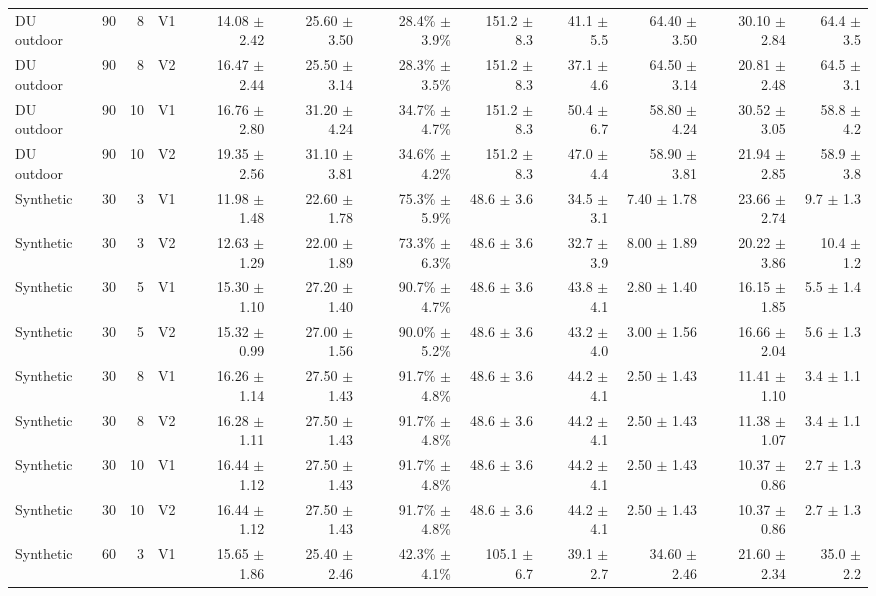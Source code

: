 \documentclass[10pt,a4paper]{article}
\begin{document}
\begin{landscape}
\begin{longtable}{@{}lrrlrrrrrrrr@{}}
DU outdoor & 90 & 8 & V1 & 14.08 $\pm$ 2.42 & 25.60 $\pm$ 3.50 & 28.4\% $\pm$ 3.9\% & 151.2 $\pm$ 8.3 & 41.1 $\pm$ 5.5 & 64.40 $\pm$ 3.50 & 30.10 $\pm$ 2.84 & 64.4 $\pm$ 3.5 \\
DU outdoor & 90 & 8 & V2 & 16.47 $\pm$ 2.44 & 25.50 $\pm$ 3.14 & 28.3\% $\pm$ 3.5\% & 151.2 $\pm$ 8.3 & 37.1 $\pm$ 4.6 & 64.50 $\pm$ 3.14 & 20.81 $\pm$ 2.48 & 64.5 $\pm$ 3.1 \\
DU outdoor & 90 & 10 & V1 & 16.76 $\pm$ 2.80 & 31.20 $\pm$ 4.24 & 34.7\% $\pm$ 4.7\% & 151.2 $\pm$ 8.3 & 50.4 $\pm$ 6.7 & 58.80 $\pm$ 4.24 & 30.52 $\pm$ 3.05 & 58.8 $\pm$ 4.2 \\
DU outdoor & 90 & 10 & V2 & 19.35 $\pm$ 2.56 & 31.10 $\pm$ 3.81 & 34.6\% $\pm$ 4.2\% & 151.2 $\pm$ 8.3 & 47.0 $\pm$ 4.4 & 58.90 $\pm$ 3.81 & 21.94 $\pm$ 2.85 & 58.9 $\pm$ 3.8 \\
Synthetic & 30 & 3 & V1 & 11.98 $\pm$ 1.48 & 22.60 $\pm$ 1.78 & 75.3\% $\pm$ 5.9\% & 48.6 $\pm$ 3.6 & 34.5 $\pm$ 3.1 & 7.40 $\pm$ 1.78 & 23.66 $\pm$ 2.74 & 9.7 $\pm$ 1.3 \\
Synthetic & 30 & 3 & V2 & 12.63 $\pm$ 1.29 & 22.00 $\pm$ 1.89 & 73.3\% $\pm$ 6.3\% & 48.6 $\pm$ 3.6 & 32.7 $\pm$ 3.9 & 8.00 $\pm$ 1.89 & 20.22 $\pm$ 3.86 & 10.4 $\pm$ 1.2 \\
Synthetic & 30 & 5 & V1 & 15.30 $\pm$ 1.10 & 27.20 $\pm$ 1.40 & 90.7\% $\pm$ 4.7\% & 48.6 $\pm$ 3.6 & 43.8 $\pm$ 4.1 & 2.80 $\pm$ 1.40 & 16.15 $\pm$ 1.85 & 5.5 $\pm$ 1.4 \\
Synthetic & 30 & 5 & V2 & 15.32 $\pm$ 0.99 & 27.00 $\pm$ 1.56 & 90.0\% $\pm$ 5.2\% & 48.6 $\pm$ 3.6 & 43.2 $\pm$ 4.0 & 3.00 $\pm$ 1.56 & 16.66 $\pm$ 2.04 & 5.6 $\pm$ 1.3 \\
Synthetic & 30 & 8 & V1 & 16.26 $\pm$ 1.14 & 27.50 $\pm$ 1.43 & 91.7\% $\pm$ 4.8\% & 48.6 $\pm$ 3.6 & 44.2 $\pm$ 4.1 & 2.50 $\pm$ 1.43 & 11.41 $\pm$ 1.10 & 3.4 $\pm$ 1.1 \\
Synthetic & 30 & 8 & V2 & 16.28 $\pm$ 1.11 & 27.50 $\pm$ 1.43 & 91.7\% $\pm$ 4.8\% & 48.6 $\pm$ 3.6 & 44.2 $\pm$ 4.1 & 2.50 $\pm$ 1.43 & 11.38 $\pm$ 1.07 & 3.4 $\pm$ 1.1 \\
Synthetic & 30 & 10 & V1 & 16.44 $\pm$ 1.12 & 27.50 $\pm$ 1.43 & 91.7\% $\pm$ 4.8\% & 48.6 $\pm$ 3.6 & 44.2 $\pm$ 4.1 & 2.50 $\pm$ 1.43 & 10.37 $\pm$ 0.86 & 2.7 $\pm$ 1.3 \\
Synthetic & 30 & 10 & V2 & 16.44 $\pm$ 1.12 & 27.50 $\pm$ 1.43 & 91.7\% $\pm$ 4.8\% & 48.6 $\pm$ 3.6 & 44.2 $\pm$ 4.1 & 2.50 $\pm$ 1.43 & 10.37 $\pm$ 0.86 & 2.7 $\pm$ 1.3 \\
Synthetic & 60 & 3 & V1 & 15.65 $\pm$ 1.86 & 25.40 $\pm$ 2.46 & 42.3\% $\pm$ 4.1\% & 105.1 $\pm$ 6.7 & 39.1 $\pm$ 2.7 & 34.60 $\pm$ 2.46 & 21.60 $\pm$ 2.34 & 35.0 $\pm$ 2.2 \\

\end{longtable}
\end{landscape}
\end{document}
